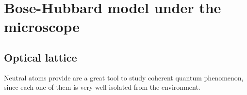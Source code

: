 
\chapter{Bose-Hubbard model under the microscope}

\section{Optical lattice}
Neutral atoms provide are a great tool to study coherent quantum phenomenon, since each one of them is very well isolated from the environment.
